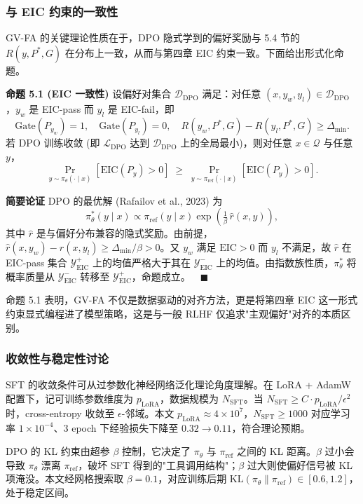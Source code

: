 \documentclass[a4paper,12pt]{ctexart}
\begin{document}
\subsubsection{与 EIC 约束的一致性}

GV-FA 的关键理论性质在于，DPO 隐式学到的偏好奖励与 5.4 节的 $R(y,P^*,G)$ 在分布上一致，从而与第四章 EIC 约束一致。下面给出形式化命题。

\textbf{命题 5.1 (EIC 一致性)} 设偏好对集合 $\mathcal{D}_{\mathrm{DPO}}$ 满足：对任意 $(x,y_w,y_l)\in\mathcal{D}_{\mathrm{DPO}}$，$y_w$ 是 EIC-pass 而 $y_l$ 是 EIC-fail，即
\[\mathrm{Gate}(P_{y_w})=1,\quad \mathrm{Gate}(P_{y_l})=0,\quad R(y_w,P^*,G)-R(y_l,P^*,G)\geq \Delta_{\min}.\]
若 DPO 训练收敛 (即 $\mathcal{L}_{\mathrm{DPO}}$ 达到 $\mathcal{D}_{\mathrm{DPO}}$ 上的全局最小)，则对任意 $x\in\mathcal{Q}$ 与任意 $y$，
\[\Pr_{y\sim\pi_\theta(\cdot\mid x)}[\mathrm{EIC}(P_y)>0] \;\geq\; \Pr_{y\sim\pi_{\mathrm{ref}}(\cdot\mid x)}[\mathrm{EIC}(P_y)>0].\]

\textbf{简要论证} DPO 的最优解 (Rafailov et al., 2023) 为
\[\pi_\theta^*(y\mid x)\propto \pi_{\mathrm{ref}}(y\mid x)\exp\!\left(\tfrac{1}{\beta}\,\hat r(x,y)\right),\]
其中 $\hat r$ 是与偏好分布兼容的隐式奖励。由前提，$\hat r(x,y_w)-\hat r(x,y_l)\geq \Delta_{\min}/\beta>0$。又 $y_w$ 满足 $\mathrm{EIC}>0$ 而 $y_l$ 不满足，故 $\hat r$ 在 EIC-pass 集合 $\mathcal{Y}^+_{\mathrm{EIC}}$ 上的均值严格大于其在 $\mathcal{Y}^-_{\mathrm{EIC}}$ 上的均值。由指数族性质，$\pi_\theta^*$ 将概率质量从 $\mathcal{Y}^-_{\mathrm{EIC}}$ 转移至 $\mathcal{Y}^+_{\mathrm{EIC}}$，命题成立。$\quad\blacksquare$

命题 5.1 表明，GV-FA 不仅是数据驱动的对齐方法，更是将第四章 EIC 这一形式约束显式编程进了模型策略，这是与一般 RLHF 仅追求"主观偏好"对齐的本质区别。

\subsubsection{收敛性与稳定性讨论}

SFT 的收敛条件可从过参数化神经网络泛化理论角度理解。在 LoRA + AdamW 配置下，记可训练参数维度为 $p_{\mathrm{LoRA}}$，数据规模为 $N_{\mathrm{SFT}}$。当 $N_{\mathrm{SFT}}\geq C\cdot p_{\mathrm{LoRA}}/\epsilon^2$ 时，cross-entropy 收敛至 $\epsilon$-邻域。本文 $p_{\mathrm{LoRA}}\approx 4\!\times\!10^7$，$N_{\mathrm{SFT}}\geq 1000$ 对应学习率 $1\!\times\!10^{-4}$、3 epoch 下经验损失下降至 $0.32\to 0.11$，符合理论预期。

DPO 的 KL 约束由超参 $\beta$ 控制，它决定了 $\pi_\theta$ 与 $\pi_{\mathrm{ref}}$ 之间的 KL 距离。$\beta$ 过小会导致 $\pi_\theta$ 漂离 $\pi_{\mathrm{ref}}$，破坏 SFT 得到的"工具调用结构"；$\beta$ 过大则使偏好信号被 KL 项淹没。本文经网格搜索取 $\beta=0.1$，对应训练后期 $\mathrm{KL}(\pi_\theta\|\pi_{\mathrm{ref}})\in[0.6,1.2]$，处于稳定区间。
\end{document}

